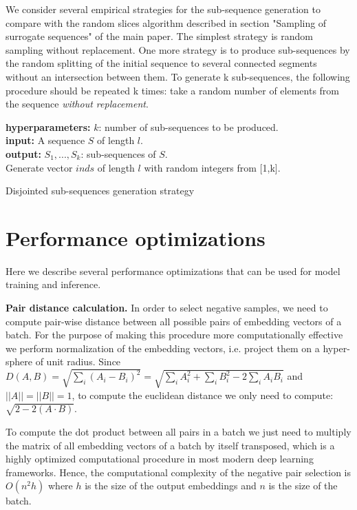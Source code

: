 \documentclass[sigconf]{acmart}
\begin{document}
We consider several empirical strategies for the sub-sequence generation to compare with the random slices algorithm described in section "Sampling of surrogate sequences" of the main paper.
The simplest strategy is random sampling without replacement.
One more strategy is to produce sub-sequences by the random splitting of the initial sequence to several connected segments without an intersection between them. To generate k sub-sequences, the following procedure should be repeated k times: take a random number of elements from the sequence \textit{without replacement}.

\begin{algorithm}
\SetAlgoLined
\textbf{hyperparameters:} $k$: number of sub-sequences to be produced. \\
\textbf{input:} A sequence $S$ of length $l$. \\
\textbf{output:} $S_1,...,S_k$: sub-sequences of $S$. \\

\BlankLine
Generate vector $inds$ of length $l$ with random integers from [1,k].\\
\caption{Disjointed sub-sequences generation strategy}
\label{alg-disj-ss}

\end{algorithm}

\section{Performance optimizations} \label{app-sec-perf-opt}

Here we describe several performance optimizations that can be used for model training and inference.

\textbf{Pair distance calculation.} In order to select negative samples, we need to compute pair-wise distance between all possible pairs of embedding vectors of a batch. For the purpose of making this procedure more computationally effective we perform normalization of the embedding vectors, i.e. project them on a hyper-sphere of unit radius. Since $D(A,B) = \sqrt{\sum_i(A_i - B_i)^2} = \sqrt{\sum_i A_i^2 + \sum_i B_i^2 - 2\sum_i A_i B_i} $ and $||A||= ||B||=1$, to compute the euclidean distance we only need to compute: $\sqrt{2 - 2(A \cdot B)}$.

To compute the dot product between all pairs in a batch we just need to multiply the matrix of all embedding vectors of a batch by itself transposed, which is a highly optimized computational procedure in most modern deep learning frameworks. Hence, the computational complexity of the negative pair selection is $O(n^2h)$ where $h$ is the size of the output embeddings and $n$ is the size of the batch.
\end{document}
